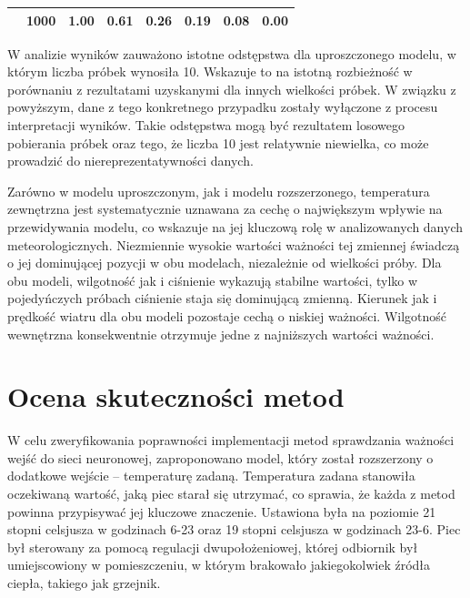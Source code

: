 \documentclass[a4paper,twoside,12pt]{book}
\begin{document}
\begin{table}[!h]
{\begin{tabular}{|c|c|c|c|c|c|c|c|}
                                                                                   & 1000                                                   & 1.00                                                              & 0.61                                                             & 0.26                                                              & 0.19                                                      & 0.08                                                      & 0.00                                                            \\ \hline
    \end{tabular}
  }
\end{table}

W analizie wyników zauważono istotne odstępstwa dla uproszczonego modelu, w którym liczba próbek wynosiła 10. Wskazuje to na istotną rozbieżność w porównaniu z rezultatami uzyskanymi dla innych wielkości próbek. W związku z powyższym, dane z tego konkretnego przypadku zostały wyłączone z procesu interpretacji wyników. Takie odstępstwa mogą być rezultatem losowego pobierania próbek oraz tego, że liczba 10 jest relatywnie niewielka, co może prowadzić do niereprezentatywności danych.

Zarówno w modelu uproszczonym, jak i modelu rozszerzonego, temperatura zewnętrzna jest systematycznie uznawana za cechę o największym wpływie na przewidywania modelu, co wskazuje na jej kluczową rolę w analizowanych danych meteorologicznych. Niezmiennie wysokie wartości ważności tej zmiennej świadczą o jej dominującej pozycji w obu modelach, niezależnie od wielkości próby. Dla obu modeli, wilgotność jak i ciśnienie wykazują stabilne wartości, tylko w pojedyńczych próbach ciśnienie staja się dominującą zmienną. Kierunek jak i prędkość wiatru dla obu modeli pozostaje cechą o niskiej ważności. Wilgotność wewnętrzna konsekwentnie otrzymuje jedne z najniższych wartości ważności.

\section{Ocena skuteczności metod}
W celu zweryfikowania poprawności implementacji metod sprawdzania ważności wejść do sieci neuronowej, zaproponowano model, który został rozszerzony o dodatkowe wejście – temperaturę zadaną. Temperatura zadana stanowiła oczekiwaną wartość, jaką piec starał się utrzymać, co sprawia, że każda z metod powinna przypisywać jej kluczowe znaczenie. Ustawiona była na poziomie 21 stopni celsjusza w godzinach 6-23 oraz 19 stopni celsjusza w godzinach 23-6. Piec był sterowany za pomocą regulacji dwupołożeniowej, której odbiornik był umiejscowiony w pomieszczeniu, w którym brakowało jakiegokolwiek źródła ciepła, takiego jak grzejnik.\\
\end{document}
